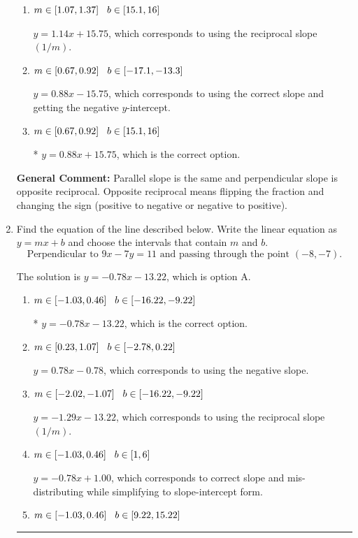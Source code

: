 \documentclass{extbook}[14pt]
\newcommand{\litem}[1]{\item #1

\rule{\textwidth}{0.4pt}}
\begin{document}
\begin{enumerate}
{\begin{enumerate}[label=\Alph*.]
 $y = -0.88x - 1.75$, which corresponds to using the negative slope.
\item \( m \in [1.07, 1.37] \hspace*{3mm} b \in [15.1, 16] \)

 $y = 1.14x + 15.75$, which corresponds to using the reciprocal slope $(1/m)$.
\item \( m \in [0.67, 0.92] \hspace*{3mm} b \in [-17.1, -13.3] \)

 $y = 0.88x - 15.75$, which corresponds to using the correct slope and getting the negative $y$-intercept.
\item \( m \in [0.67, 0.92] \hspace*{3mm} b \in [15.1, 16] \)

* $y = 0.88x + 15.75$, which is the correct option.
\end{enumerate}

\textbf{General Comment:} Parallel slope is the same and perpendicular slope is opposite reciprocal. Opposite reciprocal means flipping the fraction and changing the sign (positive to negative or negative to positive).
}
\litem{
Find the equation of the line described below. Write the linear equation as $ y=mx+b $ and choose the intervals that contain $m$ and $b$.
\[ \text{Perpendicular to } 9 x - 7 y = 11 \text{ and passing through the point } (-8, -7). \]

The solution is \( y = -0.78x - 13.22 \), which is option A.\begin{enumerate}[label=\Alph*.]
\item \( m \in [-1.03, 0.46] \hspace*{3mm} b \in [-16.22, -9.22] \)

* $y = -0.78x - 13.22$, which is the correct option.
\item \( m \in [0.23, 1.07] \hspace*{3mm} b \in [-2.78, 0.22] \)

 $y = 0.78x - 0.78$, which corresponds to using the negative slope.
\item \( m \in [-2.02, -1.07] \hspace*{3mm} b \in [-16.22, -9.22] \)

 $y = -1.29x - 13.22$, which corresponds to using the reciprocal slope $(1/m)$.
\item \( m \in [-1.03, 0.46] \hspace*{3mm} b \in [1, 6] \)

 $y = -0.78x + 1.00$, which corresponds to correct slope and mis-distributing while simplifying to slope-intercept form.
\item \( m \in [-1.03, 0.46] \hspace*{3mm} b \in [9.22, 15.22] \)


\end{enumerate}}
\end{enumerate}
\end{document}
